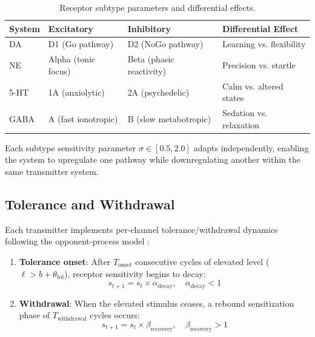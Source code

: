 \documentclass[11pt,a4paper]{article}
\begin{document}
\begin{table}[h]
\centering
\caption{Receptor subtype parameters and differential effects.}
\label{tab:receptors}
\begin{tabular}{llll}
\toprule
\textbf{System} & \textbf{Excitatory} & \textbf{Inhibitory} & \textbf{Differential Effect} \\
\midrule
DA & D1 (Go pathway) & D2 (NoGo pathway) & Learning vs. flexibility \\
NE & Alpha (tonic focus) & Beta (phasic reactivity) & Precision vs. startle \\
5-HT & 1A (anxiolytic) & 2A (psychedelic) & Calm vs. altered states \\
GABA & A (fast ionotropic) & B (slow metabotropic) & Sedation vs. relaxation \\
\bottomrule
\end{tabular}
\end{table}

Each subtype sensitivity parameter $\sigma \in [0.5, 2.0]$ adapts independently, enabling the system to upregulate one pathway while downregulating another within the same transmitter system.

\subsection{Tolerance and Withdrawal}

Each transmitter implements per-channel tolerance/withdrawal dynamics following the opponent-process model \citep{koob2001}:

\begin{enumerate}
  \item \textbf{Tolerance onset}: After $T_{\text{onset}}$ consecutive cycles of elevated level ($\ell > b + \theta_{\text{tol}}$), receptor sensitivity begins to decay:
  \begin{equation}
    s_{t+1} = s_t \times \alpha_{\text{decay}}, \quad \alpha_{\text{decay}} < 1
  \end{equation}
  \item \textbf{Withdrawal}: When the elevated stimulus ceases, a rebound sensitization phase of $T_{\text{withdrawal}}$ cycles occurs:
  \begin{equation}
    s_{t+1} = s_t \times \beta_{\text{recovery}}, \quad \beta_{\text{recovery}} > 1
  \end{equation}
\end{enumerate}
\end{document}
